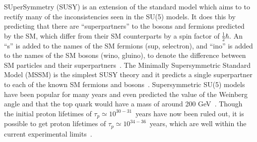 SUperSymmetry (SUSY) is an extension of the standard model which aims to to rectify many of the inconsistencies seen in the SU(5) models. It does this by predicting that there are ``superpartners'' to the bosons and fermions predicted by the SM, which differ from their SM counterparts by a spin factor of $\frac{1}{2}\hbar$. An ``s'' is added to the names of the SM fermions (sup, selectron), and ``ino'' is added to the names of the SM bosons (wino, gluino), to denote the difference between SM particles and their superpartners~\citep{Martin:1997ns}. The Minimally Supersymmetric Standard Model (MSSM) is the simplest SUSY theory and it predicts a single superpartner to each of the known SM fermions and bosons~\citep{Castano:1993ri}. Supersymmetric SU(5) models have been popular for many years and even predicted the value of the Weinberg angle and that the top quark would have a mass of around 200 GeV~\citep{Senjanovic:2009kr}. Though the initial proton lifetimes of $\tau_{p} \simeq 10^{30-31}$~years have now been ruled out, it is possible to get proton lifetimes of $\tau_{p} \simeq 10^{34-36}$~years, which are well within the current experimental limits~\citep{Gomez:1999kv}. \\

